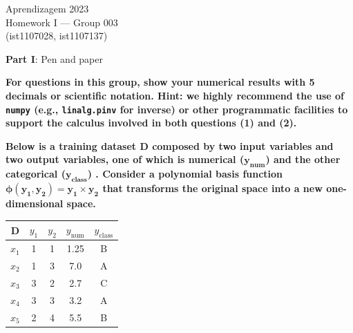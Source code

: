\documentclass[12pt]{article}
\begin{document}
\begin{center}
Aprendizagem 2023\\
Homework I --- Group 003\\
(ist1107028, ist1107137)\vskip 1cm
\end{center}

\large{\textbf{Part I}: Pen and paper}\normalsize

\vspace{10pt}
\textbf{For questions in this group, show your numerical results with 5 decimals or scientific notation.
Hint: we highly recommend the use of \texttt{numpy} (e.g., \texttt{linalg.pinv} for inverse) or other programmatic
facilities to support the calculus involved in both questions (1) and (2).}

\textbf{Below is a training dataset $\mathbf{D}$ composed by two input variables and two output variables, one of 
which is numerical ($\mathbf{y_{num}}$) and the other categorical ($\mathbf{y_{class}}$) . Consider a polynomial basis function
$\mathbf{\phi(y_1,y_2) = y_1 \times y_2}$ that transforms the original space into a new one-dimensional space.}

\begin{table}[H]
    \begin{center}
        \begin{tabular}{c|cc|cc}
            D & $y_1$ & $y_2$ & $y_{\text{num}}$ & $y_{\text{class}}$ \\
            \hline
            $x_1$ & 1 & 1 & 1.25 & B \\
            $x_2$ & 1 & 3 & 7.0 & A \\
            $x_3$ & 3 & 2 & 2.7 & C \\
            $x_4$ & 3 & 3 & 3.2 & A \\
            $x_5$ & 2 & 4 & 5.5 & B \\
        \end{tabular}
    \end{center}
\end{table}
\end{document}
